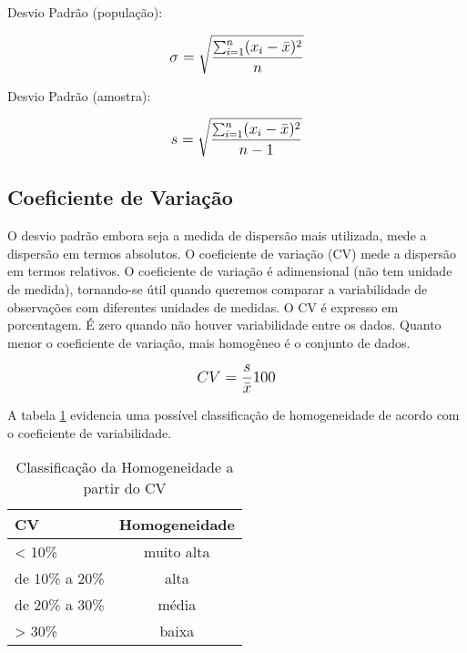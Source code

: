 Desvio Padrão (população):

\[\beq{ \sigma=\sqrt{\frac{\sum_{i=1}^{n} (x_i - \bar{x})^2}{n}} }\]

Desvio Padrão (amostra):

\[\beq{ s=\sqrt{\frac{\sum_{i=1}^{n} (x_i - \bar{x})^2}{n-1}} }\]

\subsection{Coeficiente de Variação}

O desvio padrão embora seja a medida de dispersão mais utilizada, mede a dispersão em termos absolutos. O coeficiente de variação (CV) mede a dispersão em termos relativos. O coeficiente de variação é adimensional (não tem unidade de medida), tornando-se útil quando queremos comparar a variabilidade de observações com diferentes unidades de medidas. O CV é expresso em porcentagem. É zero quando não houver variabilidade entre os dados. Quanto menor o coeficiente de variação, mais
homogêneo é o conjunto de dados.

\[\beq{ CV=\frac{s}{\bar{x}} 100 }\]

A tabela \ref{tab:coeficiente-variabilidade} evidencia uma possível classificação de homogeneidade de acordo com o coeficiente de variabilidade.

\begin{table}[h]
	\centering	
	\caption{Classificação da Homogeneidade a partir do CV}
	\label{tab:coeficiente-variabilidade}
	\begin{tabular}{l|c} 
		CV 		& Homogeneidade	\\
		\hline
		< 10\%		& muito alta	\\
		de 10\% a 20\%	& alta		\\
		de 20\% a 30\%	& média		\\
		> 30\%			& baixa		
	\end{tabular}
\end{table}


